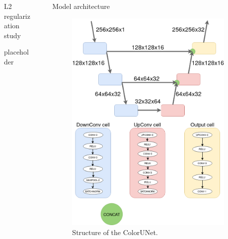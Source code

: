 \documentclass[final]{beamer}
\newlength{\sepwid}
\newlength{\onecolwid}
\newlength{\twocolwid}
\begin{document}
\begin{frame}[t]
\begin{columns}[t]
\begin{column}{\twocolwid}
\begin{columns}[t,totalwidth=\twocolwid]
\begin{column}{\onecolwid}
\end{column} %

\begin{column}{\onecolwid} %


\begin{block}{L2 regularization study}

placeholder

\end{block}


\end{column} %

\end{columns} %

\end{column} %

\begin{column}{\sepwid}\end{column} %

\begin{column}{\onecolwid} %


\begin{block}{Model architecture}

  \begin{figure}
  \begin{center}
  \includegraphics[width=.5\linewidth]{diagram}
  \caption{Structure of the ColorUNet.}
  \label{good}
  \end{center}
  \end{figure}
  

\end{block}
\end{column}
\end{columns}
\end{frame}
\end{document}
